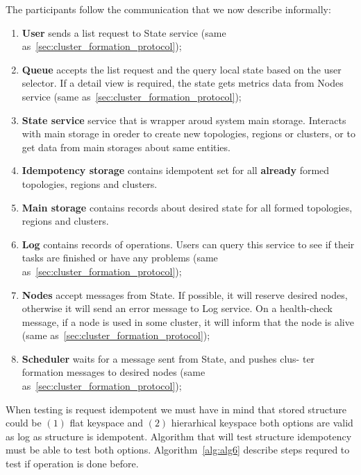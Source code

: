 The participants follow the communication that we now describe informally:
\begin{enumerate}[start=1,label={(\bfseries \arabic*)}]
	\item \textbf{User} sends a list request to State service (same as~\ref{sec:cluster_formation_protocol});
	\item \textbf{Queue} accepts the list request and the query local state based on the user selector. If a detail view is required, the state gets metrics data from Nodes service (same as~\ref{sec:cluster_formation_protocol});
	\item \textbf{State service} service that is wrapper aroud system main storage. Interacts with main storage in oreder to create new topologies, regions or clusters, or to get data from main storages about same entities.
	\item \textbf{Idempotency storage} contains idempotent set for all \textbf{already} formed topologies, regions and clusters.
	\item \textbf{Main storage} contains records about desired state for all formed topologies, regions and clusters.
	\item \textbf{Log} contains records of operations. Users can query this service to see if their tasks are finished or have any problems (same as~\ref{sec:cluster_formation_protocol});
	\item \textbf{Nodes} accept messages from State. If possible, it will reserve desired nodes, otherwise it will send an error message to Log service. On a health-check message, if a node is used in some cluster, it will inform that the node is alive (same as~\ref{sec:cluster_formation_protocol});
	\item \textbf{Scheduler} waits for a message sent from State, and pushes clus- ter formation messages to desired nodes (same as~\ref{sec:cluster_formation_protocol});
\end{enumerate}

When testing is request idempotent we must have in mind that stored structure could be $(1)$ flat keyspace and $(2)$ hierarhical keyspace both options are valid as log as structure is idempotent. Algorithm that will test structure idempotency must be able to test both options. Algorithm~\ref{alg:alg6} describe steps requred to test if operation is done before.

